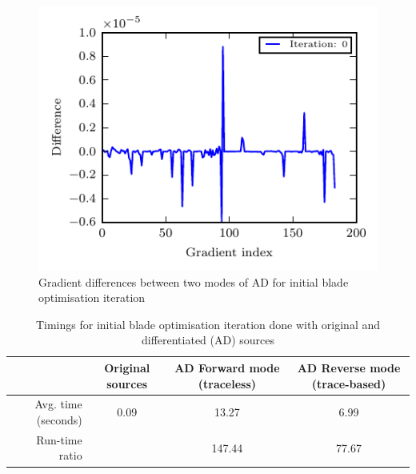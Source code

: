 \documentclass[9pt,academicons]{article}
\begin{document}
\begin{figure}
 \begin{center}
  \includegraphics{img/ForwardVsReverseCADOnly_GradDifference.pdf}
  \caption{Gradient differences between two modes of AD for initial blade optimisation iteration}
  \label{fig:forwardvsreversecadonlygraddiff}
 \end{center}
\end{figure}


\begin{table}[h!]
\centering
\begin{tabular}{r|ccc}
& Original sources & AD Forward mode (traceless) & AD Reverse mode (trace-based)\\ \hline
Avg. time (seconds)& 0.09 & 13.27 & 6.99\\
Run-time ratio & & 147.44 & 77.67 
\end{tabular}
\caption{Timings for initial blade optimisation iteration done with original and differentiated (AD) sources}
\label{tab:computationaltimedifference}
\end{table}
\end{document}
